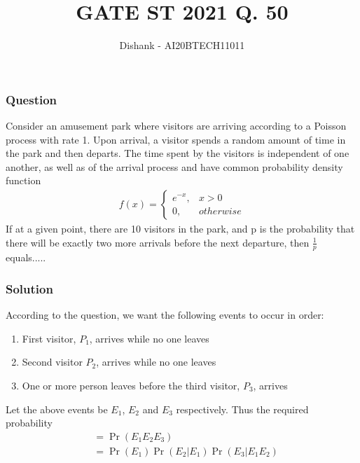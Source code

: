 \documentclass{beamer}
\title{GATE ST 2021 Q. 50}
\author{Dishank - AI20BTECH11011}
\date{}
\providecommand{\pr}[1]{\ensuremath{\Pr\left(#1\right)}}
\begin{document}
\begin{frame}
\titlepage
\end{frame}
\begin{frame}
\frametitle{Question}

\begin{block}{}
Consider an amusement park where visitors are arriving according to a Poisson process with rate 1. Upon arrival, a visitor spends a random amount of time in the park and then departs. The time spent by the visitors is independent of one another, as well as of the arrival process and have common probability density function 
\begin{align}
    f(x) = 
    \begin{cases}
        e^{-x}, & x > 0\\
        0,      & otherwise
    \end{cases}
\end{align}
If at a given point, there are 10 visitors in the park, and p is the probability that there will be exactly two more arrivals before the next departure, then $\frac{1}{p}$ equals.....
\end{block}

\end{frame}
\begin{frame}
\frametitle{Solution}

According to the question, we want the following events to occur in order: 
\begin{enumerate}
    \item First visitor, $P_1$, arrives while no one leaves
    \item Second visitor $P_2$, arrives while no one leaves
    \item One or more person leaves before the third visitor, $P_3$, arrives
\end{enumerate}

Let the above events be $E_1$, $E_2$ and $E_3$ respectively. Thus the required probability
\begin{align}
    &= \pr{E_1E_2E_3}\\
    &= \pr{E_1}\pr{E_2|E_1}\pr{E_3|E_1E_2}\label{Requiredprobability}
\end{align}
\end{frame}
\end{document}
